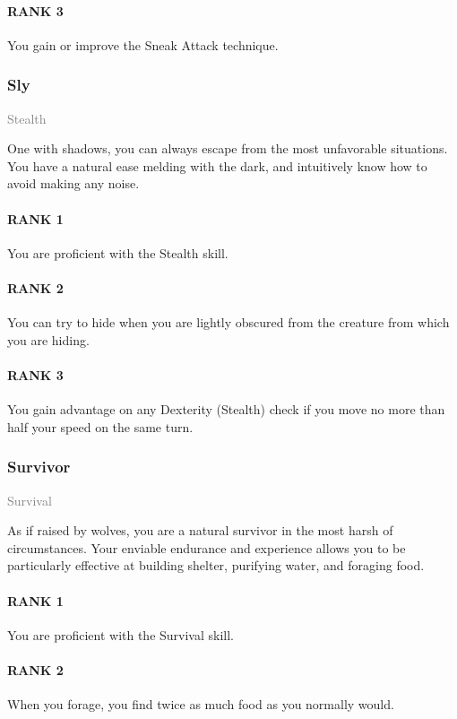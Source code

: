 \paragraph{RANK 3} You gain or improve the Sneak Attack technique.

\subsubsection{Sly} \label{feat::sly}
\small{\textcolor{gray}{Stealth}}

\normalsize
One with shadows, you can always escape from the most unfavorable situations.
You have a natural ease melding with the dark, and intuitively know how to avoid making any noise.
\paragraph{RANK 1} You are proficient with the Stealth skill.
\paragraph{RANK 2} You can try to hide when you are lightly obscured from the creature from which you are hiding.
\paragraph{RANK 3} You gain advantage on any Dexterity (Stealth) check if you move no more than half your speed on the same turn.

\subsubsection{Survivor} \label{feat::survivor}
\small{\textcolor{gray}{Survival}}

\normalsize
As if raised by wolves, you are a natural survivor in the most harsh of circumstances.
Your enviable endurance and experience allows you to be particularly effective at building shelter, purifying water, and foraging food.
\paragraph{RANK 1} You are proficient with the Survival skill.
\paragraph{RANK 2} When you forage, you find twice as much food as you normally would.
